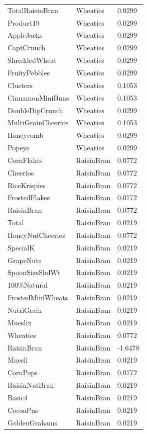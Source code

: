 \begin{table}[!htbp]
\begin{tabular}{lll}
\\
TotalRaisinBran & Wheaties & 0.0299
\\
Product19 & Wheaties & 0.0299
\\
AppleJacks & Wheaties & 0.0299
\\
CaptCrunch & Wheaties & 0.0299
\\
ShreddedWheat & Wheaties & 0.0299
\\
FruityPebbles & Wheaties & 0.0299
\\
Clusters & Wheaties & 0.1053
\\
CinnamonMiniBuns & Wheaties & 0.1053
\\
DoubleDipCrunch & Wheaties & 0.0299
\\
MultiGrainCheerios & Wheaties & 0.1053
\\
Honeycomb & Wheaties & 0.0299
\\
Popeye & Wheaties & 0.0299
\\
CornFlakes & RaisinBran & 0.0772
\\
Cheerios & RaisinBran & 0.0772
\\
RiceKrispies & RaisinBran & 0.0772
\\
FrostedFlakes & RaisinBran & 0.0772
\\
RaisinBran & RaisinBran & 0.0772
\\
Total & RaisinBran & 0.0219
\\
HoneyNutCheerios & RaisinBran & 0.0772
\\
SpecialK & RaisinBran & 0.0219
\\
GrapeNuts & RaisinBran & 0.0219
\\
SpoonSizeShdWt & RaisinBran & 0.0219
\\
100\%Natural & RaisinBran & 0.0219
\\
FrostedMiniWheats & RaisinBran & 0.0219
\\
NutriGrain & RaisinBran & 0.0219
\\
Mueslix & RaisinBran & 0.0219
\\
Wheaties & RaisinBran & 0.0772
\\
RaisinBran & RaisinBran & -1.6478
\\
Muesli & RaisinBran & 0.0219
\\
CornPops & RaisinBran & 0.0772
\\
RaisinNutBran & RaisinBran & 0.0219
\\
Basic4 & RaisinBran & 0.0219
\\
CocoaPus & RaisinBran & 0.0219
\\
GoldenGrahams & RaisinBran & 0.0219
\\

\end{tabular}
\end{table}
